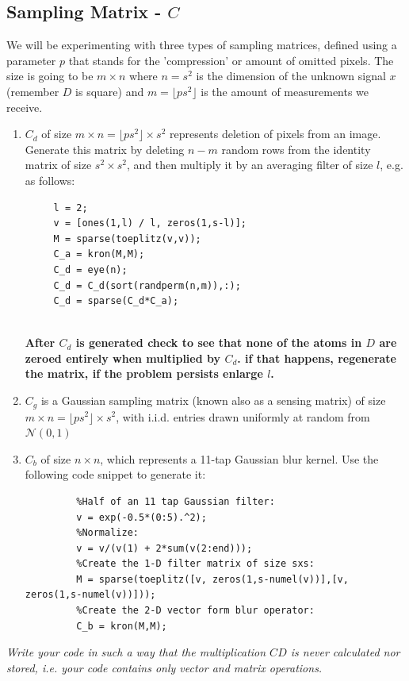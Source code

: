 \documentclass[]{article}
\begin{document}
\subsection{Sampling Matrix - $C$} 
We will be experimenting with three types of sampling matrices, defined using a parameter $p$ that stands for the 'compression' or amount of omitted pixels. The size is going to be $m\times n$ where $n=s^2$ is the dimension of the unknown signal $x$ (remember $D$ is square) and $m=\lfloor ps^2\rfloor$ is the amount of measurements we receive.        
\begin{enumerate}
	\item $C_d$ of size $m\times n =\lfloor ps^2\rfloor\times s^2$ represents deletion of pixels from an image. Generate this matrix by deleting $n-m$ random rows from the identity matrix of size $s^2 \times s^2$, {\color{blue} and then multiply it by an averaging filter of size $l$, e.g. as follows:  }
	\begin{lstlisting}
	 l = 2;    
	 v = [ones(1,l) / l, zeros(1,s-l)];  
	 M = sparse(toeplitz(v,v)); 
	 C_a = kron(M,M); 
	 C_d = eye(n);
	 C_d = C_d(sort(randperm(n,m)),:);
	 C_d = sparse(C_d*C_a); 
	      
	\end{lstlisting}
	
	\textbf{After $C_d$ is generated check to see that none of the atoms in $D$ are zeroed entirely when multiplied by $C_d$. if that happens, regenerate the matrix, {\color{blue} if the problem persists enlarge $l$}. }
	
	\item $C_g$ is a Gaussian sampling matrix (known also as a sensing matrix) of size $m\times n =\lfloor ps^2\rfloor\times s^2$, with i.i.d. entries drawn uniformly at random from $\mathcal{N}(0,1)$
	
	\item $C_b$ of size $n\times n$, which represents a 11-tap Gaussian blur kernel. Use the following code snippet to generate it: 
	\begin{lstlisting}
	     %Half of an 11 tap Gaussian filter:  
	     v = exp(-0.5*(0:5).^2); 
	     %Normalize:
	     v = v/(v(1) + 2*sum(v(2:end))); 
	     %Create the 1-D filter matrix of size sxs:  
	     M = sparse(toeplitz([v, zeros(1,s-numel(v))],[v, zeros(1,s-numel(v))])); 
	     %Create the 2-D vector form blur operator:
	     C_b = kron(M,M);
	\end{lstlisting}
	 
\end{enumerate}
\emph{Write your code in such a way that the multiplication $CD$ is never calculated nor stored, i.e. your code contains only vector and matrix operations.}
\end{document}
